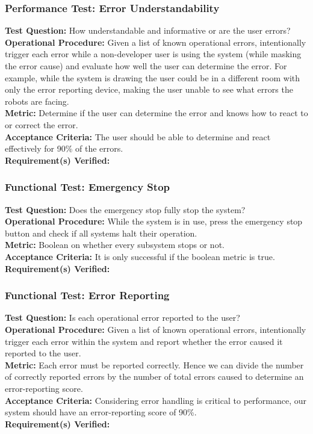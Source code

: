 \subsubsection{Performance Test: Error Understandability}
\label{sec:ui_pt_error_understand}
\textbf{Test Question:} How understandable and informative or are the user errors?\\
\textbf{Operational Procedure:} Given a list of known operational errors, intentionally trigger each error while a non-developer user is using the system (while masking the error cause) and evaluate how well the user can determine the error. For example, while the system is drawing the user could be in a different room with only the error reporting device, making the user unable to see what errors the robots are facing.\\
\textbf{Metric:}  Determine if the user can determine the error and knows how to react to or correct the error. \\
\textbf{Acceptance Criteria:}  The user should be able to determine and react effectively for 90\% of the errors.\\
\textbf{Requirement(s) Verified:} 

\subsubsection{Functional Test: Emergency Stop}
\label{sec:ui_ft_emergency_stop}
\textbf{Test Question:} Does the emergency stop fully stop the system? \\
\textbf{Operational Procedure:} While the system is in use, press the emergency stop button and check if all systems halt their operation. \\
\textbf{Metric:} Boolean on whether every subsystem stops or not. \\
\textbf{Acceptance Criteria:} It is only successful if the boolean metric is true. \\
\textbf{Requirement(s) Verified:}  

\subsubsection{Functional Test: Error Reporting}
\label{sec:ui_ft_error_reporting}
\textbf{Test Question:} Is each operational error reported to the user? \\
\textbf{Operational Procedure:} Given a list of known operational errors, intentionally trigger each error within the system and report whether the error caused it reported to the user. \\
\textbf{Metric:} Each error must be reported correctly. Hence we can divide the number of correctly reported errors by the number of total errors caused to determine an error-reporting score.  \\
\textbf{Acceptance Criteria:} Considering error handling is critical to performance, our system should have an error-reporting score of 90\%. \\
\textbf{Requirement(s) Verified:}  

